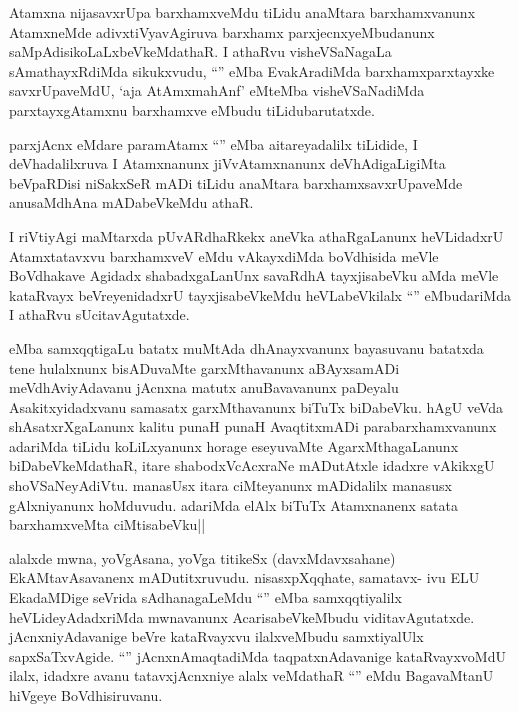 
\begin{artha}
Atamxna nijasavxrUpa barxhamxveMdu tiLidu anaMtara barxhamxvanunx AtamxneMde adivxtiVyavAgiruva barxhamx parxjecnxyeMbudanunx saMpAdisikoLaLxbeVkeMdathaR. I athaRvu visheVSaNagaLa sAmathayxRdiMda sikukxvudu, ``\stext'' eMba EvakAradiMda barxhamxparxtayxke savxrUpaveMdU, `aja AtAmxmahAnf' eMteMba visheVSaNadiMda parxtayxgAtamxnu barxhamxve eMbudu tiLidubarutatxde. 
\end{artha}


\begin{artha}
parxjAcnx eMdare paramAtamx ``\stext'' eMba aitareyadalilx tiLidide, I deVhadalilxruva I Atamxnanunx jiVvAtamxnanunx deVhAdigaLigiMta beVpaRDisi niSakxSeR mADi tiLidu anaMtara barxhamxsavxrUpaveMde anusaMdhAna mADabeVkeMdu athaR.

I riVtiyAgi maMtarxda pUvARdhaRkekx aneVka athaRgaLanunx heVLidadxrU Atamxtatavxvu barxhamxveV eMdu vAkayxdiMda boVdhisida meVle BoVdhakave Agidadx shabadxgaLanUnx savaRdhA tayxjisabeVku aMda meVle kataRvayx beVreyenidadxrU tayxjisabeVkeMdu heVLabeVkilalx ``\stext'' eMbudariMda I athaRvu sUcitavAgutatxde.
\end{artha}

\begin{artha}
eMba samxqqtigaLu batatx muMtAda dhAnayxvanunx bayasuvanu batatxda tene hulalxnunx bisADuvaMte garxMthavanunx aBAyxsamADi meVdhAviyAdavanu jAcnxna matutx anuBavavanunx paDeyalu Asakitxyidadxvanu samasatx garxMthavanunx biTuTx biDabeVku. hAgU veVda shAsatxrXgaLanunx kalitu punaH punaH AvaqtitxmADi parabarxhamxvanunx adariMda tiLidu koLiLxyanunx horage eseyuvaMte AgarxMthagaLanunx biDabeVkeMdathaR, itare shabodxVcAcxraNe mADutAtxle idadxre vAkikxgU shoVSaNeyAdiVtu. manasUsx itara ciMteyanunx mADidalilx manasusx gAlxniyanunx hoMduvudu. adariMda elAlx biTuTx Atamxnanenx satata barxhamxveMta ciMtisabeVku||
\end{artha}

\begin{artha}
alalxde mwna, yoVgAsana, yoVga titikeSx (davxMdavxsahane) EkAMtavAsavanenx mADutitxruvudu. nisasxpXqqhate, samatavx- ivu ELU EkadaMDige seVrida sAdhanagaLeMdu ``\stext'' eMba samxqqtiyalilx heVLideyAdadxriMda mwnavanunx AcarisabeVkeMbudu viditavAgutatxde. jAcnxniyAdavanige beVre kataRvayxvu ilalxveMbudu samxtiyalUlx sapxSaTxvAgide. ``\stext'' jAcnxnAmaqtadiMda taqpatxnAdavanige kataRvayxvoMdU ilalx, idadxre avanu tatavxjAcnxniye alalx veMdathaR ``\stext'' eMdu BagavaMtanU hiVgeye BoVdhisiruvanu.
\end{artha}

